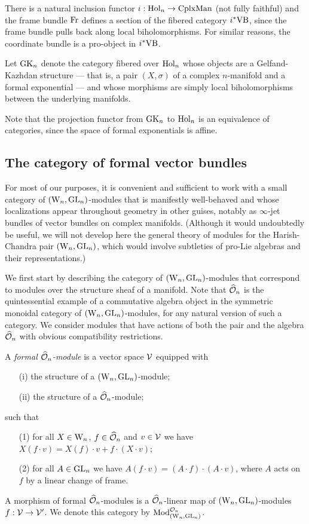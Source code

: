 There is a natural inclusion functor $i : {\rm Hol}_n \to {\rm CplxMan}$ (not fully faithful) and the frame bundle ${\rm Fr}$ defines a section of the fibered category $i^*{\rm VB}$,
since the frame bundle pulls back along local biholomorphisms.
For similar reasons, the coordinate bundle is a pro-object in $i^*{\rm VB}$.

\begin{dfn}
Let ${\rm GK}_n$ denote the category fibered over ${\rm Hol}_n$ whose objects are a Gelfand-Kazhdan structure 
--- that is, a pair $(X, \sigma)$ of a complex $n$-manifold and a formal exponential ---
and whose morphisms are simply local biholomorphisms between the underlying manifolds.
\end{dfn}

Note that the projection functor from ${\rm GK}_n$ to ${\rm Hol}_n$ is an equivalence of categories, since the space of formal exponentials is affine.

\subsection{The category of formal vector bundles}

For most of our purposes, it is convenient and sufficient to work with a small category of $({{\rm W}_n},{\rm GL}_n)$-modules 
that is manifestly well-behaved and whose localizations appear throughout geometry in other guises, 
notably as $\infty$-jet bundles of vector bundles on complex manifolds.
(Although it would undoubtedly be useful, we will not develop here the general theory of modules for the Harish-Chandra pair $({{\rm W}_n},{\rm GL}_n)$, 
which would involve subtleties of pro-Lie algebras and their representations.)

We first start by describing the category of $({{\rm W}_n}, {\rm GL}_n)$-modules
that correspond to modules over the structure sheaf of a manifold. Note that $\widehat{\mathcal O}_n$ is the quintessential example of a commutative algebra object in the symmetric monoidal category of $({{\rm W}_n},{\rm GL}_n)$-modules, 
for any natural version of such a category. We consider modules that
have actions of both the pair and the algebra $\widehat{\mathcal O}_n$ with obvious
compatibility restrictions. 

\begin{dfn} A {\em formal $\widehat{\mathcal O}_n$-module} is a
  vector space $\mathcal{V}$ equipped with
\begin{itemize}
\item[(i)] the structure of a $({{\rm W}_n}, {\rm GL}_n)$-module;
\item[(ii)] the structure of a $\widehat{\mathcal O}_n$-module;
\end{itemize}
such that 
\begin{itemize}
\item[(1)] for all $X \in {{\rm W}_n}$, $f \in \widehat{\mathcal O}_n$ and $v \in \mathcal{V}$ we
  have $X(f \cdot v) = X(f) \cdot v + f \cdot (X \cdot v)$;
\item[(2)] for all $A \in {\rm GL}_n$ we have $A (f \cdot v) = (A \cdot f) \cdot (A \cdot v)$,  where $A$ acts on $f$ by a linear change of frame.
\end{itemize}
A morphism of formal $\widehat{\mathcal O}_n$-modules is a $\widehat{\mathcal O}_n$-linear map of
$({{\rm W}_n}, {\rm GL}_n)$-modules $f : \mathcal{V} \to \mathcal{V}'$. We denote this category
by ${\rm Mod}_{({{\rm W}_n}, {\rm GL}_n)}^{\mathcal O_n}$. 
\end{dfn}

